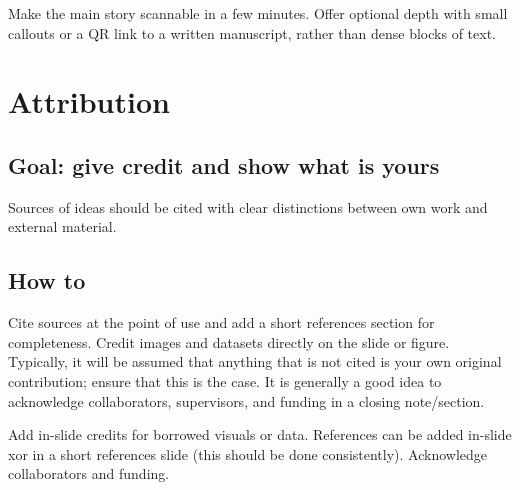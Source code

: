 \documentclass[
  a4paper,
  DIV=11,
  numbers=noendperiod,
  oneside]{scrreprt}
\begin{document}
\begin{tcolorbox}[enhanced jigsaw, colframe=quarto-callout-note-color-frame, title=\textcolor{quarto-callout-note-color}{\faInfo}\hspace{0.5em}{Poster Pacing}, breakable, opacityback=0, titlerule=0mm, colbacktitle=quarto-callout-note-color!10!white, toptitle=1mm, colback=white, coltitle=black, toprule=.15mm, bottomtitle=1mm, left=2mm, arc=.35mm, rightrule=.15mm, bottomrule=.15mm, opacitybacktitle=0.6, leftrule=.75mm]

Make the main story scannable in a few minutes. Offer optional depth
with small callouts or a QR link to a written manuscript, rather than
dense blocks of text.

\end{tcolorbox}

\section{Attribution}\label{sec-pres-attribution}

\subsection{Goal: give credit and show what is
yours}\label{goal-give-credit-and-show-what-is-yours}

Sources of ideas should be cited with clear distinctions between own
work and external material.

\subsection{How to}\label{how-to-11}

Cite sources at the point of use and add a short references section for
completeness. Credit images and datasets directly on the slide or
figure. Typically, it will be assumed that anything that is not cited is
your own original contribution; ensure that this is the case. It is
generally a good idea to acknowledge collaborators, supervisors, and
funding in a closing note/section.

\begin{tcolorbox}[enhanced jigsaw, colframe=quarto-callout-note-color-frame, title=\textcolor{quarto-callout-note-color}{\faInfo}\hspace{0.5em}{Talk Attribution}, breakable, opacityback=0, titlerule=0mm, colbacktitle=quarto-callout-note-color!10!white, toptitle=1mm, colback=white, coltitle=black, toprule=.15mm, bottomtitle=1mm, left=2mm, arc=.35mm, rightrule=.15mm, bottomrule=.15mm, opacitybacktitle=0.6, leftrule=.75mm]

Add in-slide credits for borrowed visuals or data. References can be
added in-slide xor\footnotemark{} in a short references slide (this
should be done consistently). Acknowledge collaborators and funding.

\end{tcolorbox}
\end{document}

